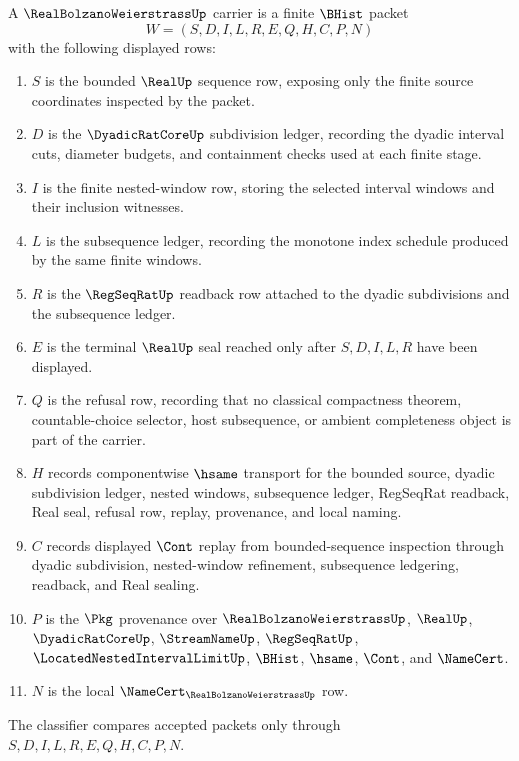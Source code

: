 \begin{definition}
\label{def:real-bolzano-weierstrass-carrier}
A $\RealBolzanoWeierstrassUp$ carrier is a finite $\BHist$ packet
$$
W=(S,D,I,L,R,E,Q,H,C,P,N)
$$
with the following displayed rows:
\begin{enumerate}
\item $S$ is the bounded $\RealUp$ sequence row, exposing only the finite source coordinates inspected by the packet.
\item $D$ is the $\DyadicRatCoreUp$ subdivision ledger, recording the dyadic interval cuts, diameter budgets, and containment checks used at each finite stage.
\item $I$ is the finite nested-window row, storing the selected interval windows and their inclusion witnesses.
\item $L$ is the subsequence ledger, recording the monotone index schedule produced by the same finite windows.
\item $R$ is the $\RegSeqRatUp$ readback row attached to the dyadic subdivisions and the subsequence ledger.
\item $E$ is the terminal $\RealUp$ seal reached only after $S,D,I,L,R$ have been displayed.
\item $Q$ is the refusal row, recording that no classical compactness theorem, countable-choice selector, host subsequence, or ambient completeness object is part of the carrier.
\item $H$ records componentwise $\hsame$ transport for the bounded source, dyadic subdivision ledger, nested windows, subsequence ledger, RegSeqRat readback, Real seal, refusal row, replay, provenance, and local naming.
\item $C$ records displayed $\Cont$ replay from bounded-sequence inspection through dyadic subdivision, nested-window refinement, subsequence ledgering, readback, and Real sealing.
\item $P$ is the $\Pkg$ provenance over $\RealBolzanoWeierstrassUp$, $\RealUp$, $\DyadicRatCoreUp$, $\StreamNameUp$, $\RegSeqRatUp$, $\LocatedNestedIntervalLimitUp$, $\BHist$, $\hsame$, $\Cont$, and $\NameCert$.
\item $N$ is the local $\NameCert_{\RealBolzanoWeierstrassUp}$ row.
\end{enumerate}
The classifier compares accepted packets only through $S,D,I,L,R,E,Q,H,C,P,N$.
\end{definition}

